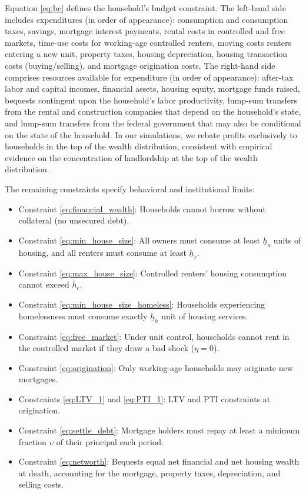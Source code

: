 \documentclass[parskip=full]{article}
\begin{document}
Equation \eqref{eq:bc} defines the household's budget constraint. The left-hand side includes expenditures (in order of appearance): consumption and consumption taxes, savings, mortgage interest payments, rental costs in controlled and free markets, time-use costs for working-age controlled renters, moving costs renters entering a new unit, property taxes, housing depreciation, housing transaction costs (buying/selling), and mortgage origination costs. The right-hand side comprises resources available for expenditure (in order of appearance): after-tax labor and capital incomes, financial assets, housing equity, mortgage funds raised, bequests contingent upon the household's labor productivity, lump-sum transfers from the rental and construction companies that depend on the household's state, and lump-sum transfers from the federal government that may also be conditional on the state of the household. In our simulations, we rebate profits exclusively to households in the top of the wealth distribution, consistent with empirical evidence on the concentration of landlordship at the top of the wealth distribution.

The remaining constraints specify behavioral and institutional limits: 
\begin{itemize}
    \item Constraint \eqref{eq:financial_wealth}: Households cannot borrow without collateral (no unsecured debt).
    \item Constraint \eqref{eq:min_house_size}: All owners must consume at least $\underline{h}_{o}$ units of housing, and all renters must consume at least $\underline{h}_{r}$.
    \item Constraint \eqref{eq:max_house_size}: Controlled renters' housing consumption cannot exceed $\overline{h}_{c}$.
    \item Constraint \eqref{eq:min_house_size_homeless}: Households experiencing homelessness must consume exactly $\underline{h}_{h}$ unit of housing services.
    \item Constraint \eqref{eq:free_market}: Under unit control, households cannot rent in the controlled market if they draw a bad shock ($\eta=0$). 
    \item Constraint \eqref{eq:origination}: Only working-age households may originate new mortgages.
    \item Constraints \eqref{eq:LTV_1} and \eqref{eq:PTI_1}: LTV and PTI constraints at origination.
    \item Constraint \eqref{eq:settle_debt}: Mortgage holders must repay at least a minimum fraction $\upsilon$ of their principal each period.
    \item Constraint \eqref{eq:networth}: Bequests equal net financial and net housing wealth at death, accounting for the mortgage, property taxes, depreciation, and selling costs.
\end{itemize} 
\end{document}
